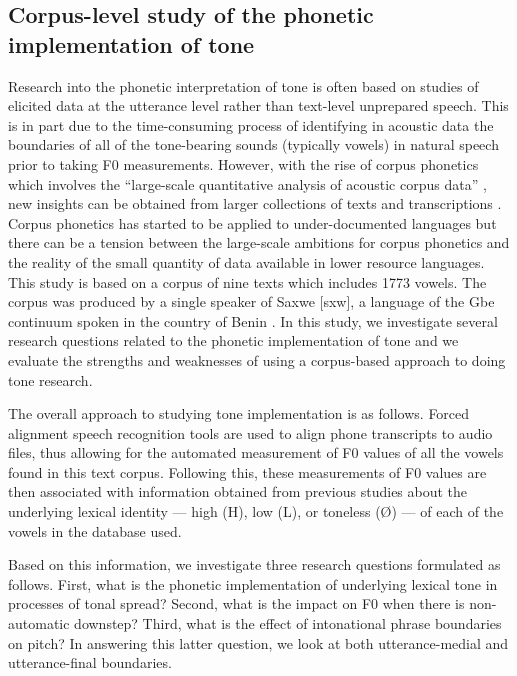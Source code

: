 \documentclass[
  11pt,
  b5paper,
]{article}
\begin{document}
\hypertarget{corpus-level-study-of-the-phonetic-implementation-of-tone}{%
\subsection{Corpus-level study of the phonetic implementation of
tone}\label{corpus-level-study-of-the-phonetic-implementation-of-tone}}

Research into the phonetic interpretation of tone is often based on
studies of elicited data at the utterance level rather than text-level
unprepared speech. This is in part due to the time-consuming process of
identifying in acoustic data the boundaries of all of the tone-bearing
sounds (typically vowels) in natural speech prior to taking F0
measurements. However, with the rise of corpus phonetics which involves
the ``large-scale quantitative analysis of acoustic corpus data''
\autocite{yao_automated_2010}, new insights can be obtained from larger
collections of texts and transcriptions
\autocite{chodroff_structured_2015}. Corpus phonetics has started to be
applied to under-documented languages \autocite{kempton_corpus_2020} but
there can be a tension between the large-scale ambitions for corpus
phonetics and the reality of the small quantity of data available in
lower resource languages. This study is based on a corpus of nine texts
which includes 1773 vowels. The corpus was produced by a single speaker
of Saxwe {[}sxw{]}, a language of the Gbe continuum
\autocite{capo_elements_1984,Capo1991comparative} spoken in the country
of Benin \autocite{eberhard_ethnologue_2019}. In this study, we
investigate several research questions related to the phonetic
implementation of tone and we evaluate the strengths and weaknesses of
using a corpus-based approach to doing tone research.

The overall approach to studying tone implementation is as follows.
Forced alignment speech recognition tools are used to align phone
transcripts to audio files, thus allowing for the automated measurement
of F0 values of all the vowels found in this text corpus. Following
this, these measurements of F0 values are then associated with
information obtained from previous studies about the underlying lexical
identity --- high (H), low (L), or toneless (Ø) --- of each of the
vowels in the database used.

Based on this information, we investigate three research questions
formulated as follows. First, what is the phonetic implementation of
underlying lexical tone in processes of tonal spread? Second, what is
the impact on F0 when there is non-automatic downstep? Third, what is
the effect of intonational phrase boundaries on pitch? In answering this
latter question, we look at both utterance-medial and utterance-final
boundaries.
\end{document}
